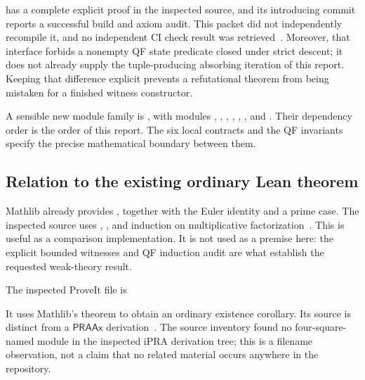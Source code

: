  has a complete explicit proof in the inspected
source, and its introducing commit reports a successful build and axiom
audit. This packet did not independently recompile it, and no independent
CI check result was retrieved~\cite{clocked}. Moreover, that interface
forbids a nonempty QF state predicate closed under strict descent; it does
not already supply the tuple-producing absorbing iteration of this report.
Keeping that difference explicit prevents a refutational theorem from
being mistaken for a finished witness constructor.

A sensible new module family is
, with modules
, , , ,
, , and .
Their dependency order is the order of this report. The six local
contracts and the QF invariants specify the precise mathematical boundary
between them.

\subsection{Relation to the existing ordinary Lean theorem}

Mathlib already provides , together with the
Euler identity and a prime case. The inspected source uses
, , and induction on multiplicative
factorization~\cite{mathlib}. This is useful as a comparison implementation.
It is not used as a premise here: the explicit bounded witnesses and QF
induction audit are what establish the requested weak-theory result.

\begin{samepage}
The inspected ProveIt file is
\begin{quote}\small
{}
\end{quote}
It uses Mathlib's theorem to obtain an ordinary existence corollary. Its
source is distinct from a $\mathsf{PRAAx}$ derivation~\cite{proveit}.
The source inventory found no four-square-named module in the inspected
iPRA derivation tree; this is a filename observation, not a claim that
no related material occurs anywhere in the repository.
\end{samepage}
